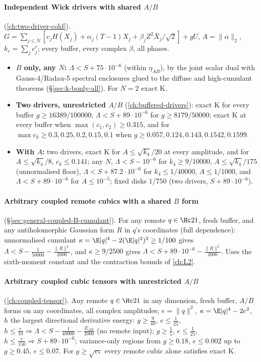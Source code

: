 \paragraph{Independent Wick drivers with shared $A/B$} (\autoref{ch:two-driver-cold}). $G=\sum_{j\le N}[c_jH(X_j)+\alpha_j(T-1)X_j+\beta_jZ^2\bar X_j/\sqrt2]+gU$,
$A=\|\alpha\|_2$, $k_r=\sum_jc_j^r$; every buffer, every complex $\beta$, all phases.
\begin{itemize}
\item \textbf{$B$ only, any $N$: $\Lambda<S+75\cdot10^{-6}$} (within $\eta_{AB}$), by the joint scalar dual with Gauss-4/Radau-5 spectral enclosures glued to the diffuse and
high-cumulant theorems (\S\ref{sec:k-bonly-all}). For $N=2$ exact K.
\item \textbf{Two drivers, unrestricted $A/B$} (\autoref{ch:buffered-drivers}): exact K for every buffer $g\ge16389/100000$; $\Lambda<S+89\cdot10^{-6}$ for
$g\ge8179/50000$; exact K at every buffer when $\max(c_1,c_2)\ge0.315$, and for $\max c_k\ge0.3,0.25,0.2,0.15,0.1$ when $g\ge0.057,0.124,0.143,0.1542,0.1599$.
\item \textbf{With $A$:} two drivers, exact K for $A\le\sqrt{k_4}/20$ at every amplitude, and for $A\le\sqrt{k_4}/8$, $c_k\le0.141$; any $N$, $\Lambda<S-10^{-6}$ for
$k_4\ge9/10000$, $A\le\sqrt{k_4}/175$ (unnormalised floor), $\Lambda<S+87.2\cdot10^{-6}$ for $k_4\le1/40000$, $A\le1/1000$, and $\Lambda<S+89\cdot10^{-6}$ for $A\le10^{-5}$;
fixed disks $1/750$ (two drivers, $S+89\cdot10^{-6}$).
\end{itemize}

\paragraph{Arbitrary coupled remote cubics with a shared $B$ form} (\S\ref{sec:general-coupled-B-cumulant}). For any remote $q\in\Hc21$, fresh buffer, and any
antiholomorphic Gaussian form $R$ in $q$'s coordinates (full dependence): unnormalised cumulant $\kappa=\E|q|^4-2(\E|q|^2)^2\ge1/100$ gives
$\Lambda<S-\frac1{50000}-\frac{\|R\|^2}{2000}$, and $\kappa\ge9/2500$ gives $\Lambda<S+89\cdot10^{-6}-\frac{\|R\|^2}{2000}$. Uses the sixth-moment constant and the
contraction bounds of \autoref{ch:L2}.

\paragraph{Arbitrary coupled cubic tensors with unrestricted $A/B$} (\autoref{ch:coupled-tensor}). Any remote $q\in\Hc21$ in any dimension, fresh buffer,
$A/B$ forms on any coordinates, all complex amplitudes; $e=\|q\|^2$, $\kappa=\E|q|^4-2e^2$, $h$ the largest directional derivative energy:
$g\ge\frac9{40}$, $e\le\frac1{25}$, $h\le\frac e{10}\Rightarrow\Lambda<S-\frac1{40000}-\frac{E_{AB}}{2000}$ (no remote input); $g\ge\frac15$,
$e\le\frac1{25}$, $h\le\frac e{150}\Rightarrow S+89\cdot10^{-6}$; variance-only regions from $g\ge0.18$, $e\le0.002$ up to $g\ge0.45$, $e\le0.07$. For
$g\ge\sqrt{v_*}$ every remote cubic alone satisfies exact K.

